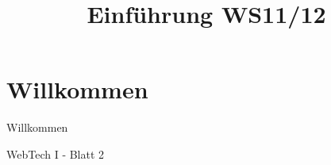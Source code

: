 \documentclass{beamer}
\title{Einführung WS11/12}
\begin{document}
\section{Willkommen}
\begin{frame}{Willkommen}
\begin{center}
\huge
WebTech I - Blatt 2
\vspace{7mm}
\end{center}
\end{frame}
\end{document}
